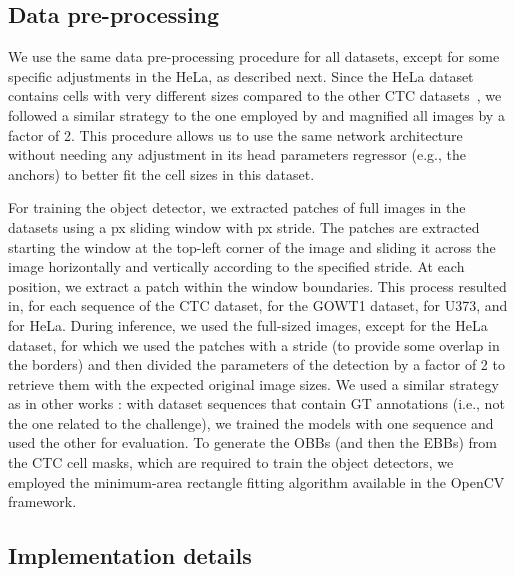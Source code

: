 \documentclass{article}
\begin{document}
\subsection{Data pre-processing} \label{sec:data_handling}

We use the same data pre-processing procedure for all datasets, except for some specific adjustments in the HeLa, as described next. Since the HeLa dataset contains cells with very different sizes compared to the other CTC datasets~\cite{isbi}, we followed a similar strategy to the one employed by \cite{cpn} and magnified all images by a factor of 2. This procedure allows us to use the same network architecture without needing any adjustment in its head parameters regressor (e.g., the anchors) to better fit the cell sizes in this dataset.

For training the object detector, we extracted patches of  full images in the datasets using a px sliding window with px stride. The patches are extracted starting the window at the top-left corner of the image and sliding it across the image horizontally and vertically according to the specified stride. At each position, we extract a patch within the window boundaries. This process resulted in, for each sequence of the CTC dataset,  for the GOWT1 dataset,  for U373, and  for HeLa. During inference, we used the full-sized images, except for the HeLa dataset, for which we used the patches with a  stride (to provide some overlap in the borders) and then divided the parameters of the detection by a factor of 2 to retrieve them with the expected original image sizes. We used a similar strategy as in other works \cite{kth,epflheid,blob,cpn,drl}: with dataset sequences that contain GT annotations (i.e., not the one related to the challenge), we trained the models with one sequence and used the other for evaluation.   
To generate the OBBs (and then the EBBs) from the CTC cell masks, which are required to train the object detectors, we employed the minimum-area rectangle fitting algorithm available in the OpenCV~\cite{opencv} framework.


\subsection{Implementation details}
\end{document}
